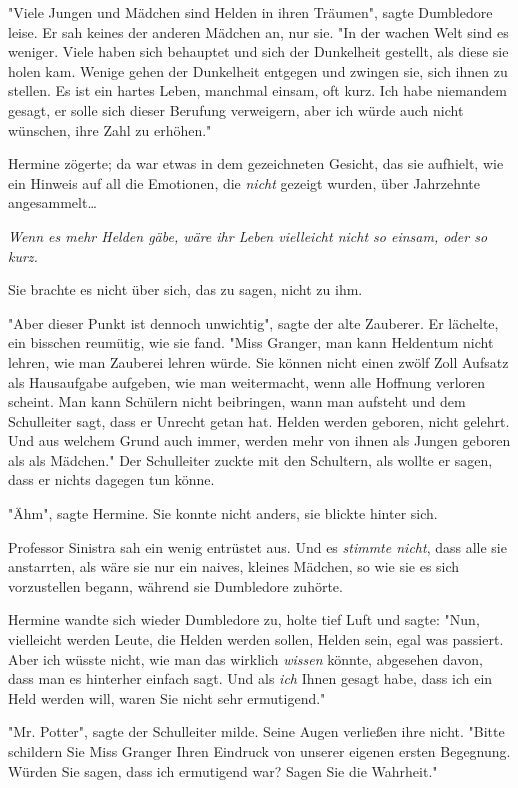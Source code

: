 {"Viele Jungen und Mädchen sind Helden in ihren Träumen", sagte Dumbledore leise. Er sah keines der anderen Mädchen an, nur sie. "In der wachen Welt sind es weniger. Viele haben sich behauptet und sich der Dunkelheit gestellt, als diese sie holen kam. Wenige gehen der Dunkelheit entgegen und zwingen sie, sich ihnen zu stellen. Es ist ein hartes Leben, manchmal einsam, oft kurz. Ich habe niemandem gesagt, er solle sich dieser Berufung verweigern, aber ich würde auch nicht wünschen, ihre Zahl zu erhöhen."

Hermine zögerte; da war etwas in dem gezeichneten Gesicht, das sie aufhielt, wie ein Hinweis auf all die Emotionen, die \emph{nicht} gezeigt wurden, über Jahrzehnte angesammelt…

\emph{\emph{Wenn es mehr Helden gäbe, wäre ihr Leben vielleicht nicht so einsam, oder so} \emph{kurz.}}

Sie brachte es nicht über sich, das zu sagen, nicht zu ihm.

"Aber dieser Punkt ist dennoch unwichtig", sagte der alte Zauberer. Er lächelte, ein bisschen reumütig, wie sie fand. "Miss Granger, man kann Heldentum nicht lehren, wie man Zauberei lehren würde. Sie können nicht einen zwölf Zoll Aufsatz als Hausaufgabe aufgeben, wie man weitermacht, wenn alle Hoffnung verloren scheint. Man kann Schülern nicht beibringen, wann man aufsteht und dem Schulleiter sagt, dass er Unrecht getan hat. Helden werden geboren, nicht gelehrt. Und aus welchem Grund auch immer, werden mehr von ihnen als Jungen geboren als als Mädchen." Der Schulleiter zuckte mit den Schultern, als wollte er sagen, dass er nichts dagegen tun könne.

"Ähm", sagte Hermine. Sie konnte nicht anders, sie blickte hinter sich.

Professor Sinistra sah ein wenig entrüstet aus. Und es \emph{stimmte nicht}, dass alle sie anstarrten, als wäre sie nur ein naives, kleines Mädchen, so wie sie es sich vorzustellen begann, während sie Dumbledore zuhörte.

Hermine wandte sich wieder Dumbledore zu, holte tief Luft und sagte: "Nun, vielleicht werden Leute, die Helden werden sollen, Helden sein, egal was passiert. Aber ich wüsste nicht, wie man das wirklich \emph{wissen} könnte, abgesehen davon, dass man es hinterher einfach sagt. Und als \emph{ich} Ihnen gesagt habe, dass ich ein Held werden will, waren Sie nicht sehr ermutigend."

"Mr. Potter", sagte der Schulleiter milde. Seine Augen verließen ihre nicht. "Bitte schildern Sie Miss Granger Ihren Eindruck von unserer eigenen ersten Begegnung. Würden Sie sagen, dass ich ermutigend war? Sagen Sie die Wahrheit."

}
